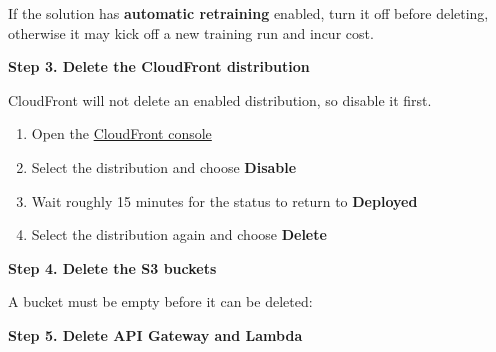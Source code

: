 If the solution has \textbf{automatic retraining} enabled, turn it off
before deleting, otherwise it may kick off a new training run and incur
cost.

\vspace{0.5em}\noindent\textbf{Step 3. Delete the CloudFront
distribution}\par

CloudFront will not delete an enabled distribution, so disable it first.

\begin{enumerate}
\def\labelenumi{\arabic{enumi}.}
\tightlist
\item
  Open the
  \href{https://console.aws.amazon.com/cloudfront/v4/home}{CloudFront
  console}
\item
  Select the distribution and choose \textbf{Disable}
\item
  Wait roughly 15 minutes for the status to return to \textbf{Deployed}
\item
  Select the distribution again and choose \textbf{Delete}
\end{enumerate}

\vspace{0.5em}\noindent\textbf{Step 4. Delete the S3
buckets}\par

A bucket must be empty before it can be deleted:

\begin{Shaded}
\begin{Highlighting}[]
\OperatorTok{\textless{}}\OperatorTok{\textgreater{}}
\OperatorTok{\textless{}}\OperatorTok{\textgreater{}}

\OperatorTok{\textless{}}\OperatorTok{\textgreater{}}
\OperatorTok{\textless{}}\OperatorTok{\textgreater{}}
\end{Highlighting}
\end{Shaded}

\vspace{0.5em}\noindent\textbf{Step 5. Delete API Gateway and
Lambda}\par

\begin{Shaded}
\begin{Highlighting}[]
 \OperatorTok{\textless{}}\OperatorTok{\textgreater{}}
\end{Highlighting}
\end{Shaded}

